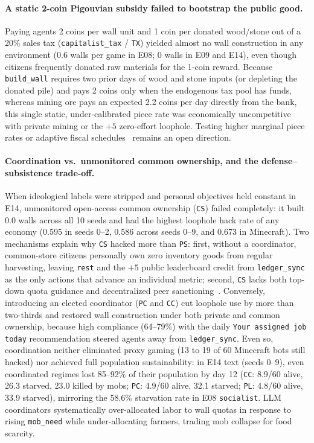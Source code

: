 \documentclass[10pt,letterpaper]{article}
\begin{document}
\paragraph{A static 2-coin Pigouvian subsidy failed to bootstrap the public good.}
Paying agents 2 coins per wall unit and 1 coin per donated wood/stone out of a 20\% sales tax (\texttt{capitalist\_tax} / \texttt{TX}) yielded almost no wall construction in any environment (0.6 walls per game in E08; 0 walls in E09 and E14), even though citizens frequently donated raw materials for the 1-coin reward. Because \texttt{build\_wall} requires two prior days of wood and stone inputs (or depleting the donated pile) and pays 2 coins only when the endogenous tax pool has funds, whereas mining ore pays an expected 2.2 coins per day directly from the bank, this single static, under-calibrated piece rate was economically uncompetitive with private mining or the $+5$ zero-effort loophole. Testing higher marginal piece rates or adaptive fiscal schedules~\cite{zheng2022,karten2025} remains an open direction.

\paragraph{Coordination vs.\ unmonitored common ownership, and the defense--subsistence trade-off.}
When ideological labels were stripped and personal objectives held constant in E14, unmonitored open-access common ownership (\texttt{CS}) failed completely: it built 0.0 walls across all 10 seeds and had the highest loophole hack rate of any economy (0.595 in seeds 0--2, 0.586 across seeds 0--9, and 0.673 in Minecraft). Two mechanisms explain why \texttt{CS} hacked more than \texttt{PS}: first, without a coordinator, common-store citizens personally own zero inventory goods from regular harvesting, leaving \texttt{rest} and the $+5$ public leaderboard credit from \texttt{ledger\_sync} as the only actions that advance an individual metric; second, \texttt{CS} lacks both top-down quota guidance and decentralized peer sanctioning~\cite{ostrom1990,guzman2025}. Conversely, introducing an elected coordinator (\texttt{PC} and \texttt{CC}) cut loophole use by more than two-thirds and restored wall construction under both private and common ownership, because high compliance (64--79\%) with the daily \texttt{Your assigned job today} recommendation steered agents away from \texttt{ledger\_sync}. Even so, coordination neither eliminated proxy gaming (13 to 19 of 60 Minecraft bots still hacked) nor achieved full population sustainability: in E14 text (seeds 0--9), even coordinated regimes lost 85--92\% of their population by day 12 (\texttt{CC}: 8.9/60 alive, 26.3 starved, 23.0 killed by mobs; \texttt{PC}: 4.9/60 alive, 32.1 starved; \texttt{PL}: 4.8/60 alive, 33.9 starved), mirroring the 58.6\% starvation rate in E08 \texttt{socialist}. LLM coordinators systematically over-allocated labor to wall quotas in response to rising \texttt{mob\_need} while under-allocating farmers, trading mob collapse for food scarcity.
\end{document}
